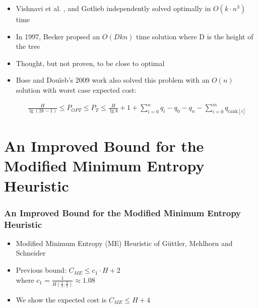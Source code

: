 \documentclass[]{beamer}
\theoremstyle{plain}
\begin{document}
\begin{frame}

\begin{itemize}

\item Vishnavi et al. \cite{vaishnavi1980optimum}, and Gotlieb  \cite{gotlieb1981optimal} independently solved optimally in $O(k\cdot n^3)$ time

\item In 1997, Becker propsed an $O(Dkn)$ time solution where D is the height of the tree \cite{becker1997construction}

\item Thought, but not proven, to be close to optimal

\item Bose and Dou\"{i}eb's 2009 work also solved this problem with an $O(n)$ solution with worst case expected cost:
\begin{scriptsize}
\begin{align*}
\frac{H}{\lg(2k-1)} \leq P_{OPT} \leq P_T \leq \frac{H}{\lg k} + 1 + \sum_{i=0}^n q_i - q_0 - q_n - \sum_{i=0}^m q_{\text{rank}[i]}
\end{align*}
\end{scriptsize}

\end{itemize}


\end{frame}


\section{An Improved Bound for the Modified Minimum Entropy Heuristic}\label{An Improved Bound for the Modified Minimum Entropy Heuristic}

\begin{frame} \frametitle{An Improved Bound for the Modified Minimum Entropy Heuristic}

\begin{itemize}

\item Modified Minimum Entropy (ME) Heuristic of G{\"u}ttler, Mehlhorn and Schneider \cite{guttler1980binary}

\item Previous bound: $C_{ME} \leq c_1\cdot H+2$ \\ where $c_1=\frac{1}{H(\frac{1}{3}, \frac{2}{3})} \approx 1.08$ 

\item We show the expected cost is $C_{ME} \leq H+4$

\end{itemize}

\end{frame}
\end{document}
